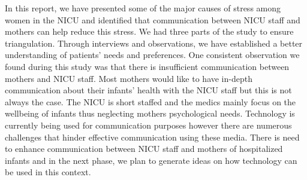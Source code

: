 In this report, we have presented some of the major causes of stress among women in the NICU and identified that communication between NICU staff and mothers can help reduce this stress. We had three parts of the study to ensure triangulation. Through interviews and observations, we have established a better understanding of patients’ needs and preferences. One consistent observation we found during this study was that there is insufficient communication between mothers and NICU staff. Most mothers would like to have in-depth communication about their infants' health with the NICU staff but this is not always the case. The NICU is short staffed and the medics mainly focus on the wellbeing of infants thus neglecting mothers psychological needs. Technology is currently being used for communication purposes however there are numerous challenges that hinder effective communication using these media. There is need to enhance communication between NICU staff and mothers of hospitalized infants and in the next phase, we plan to generate ideas on how technology can be used in this context.